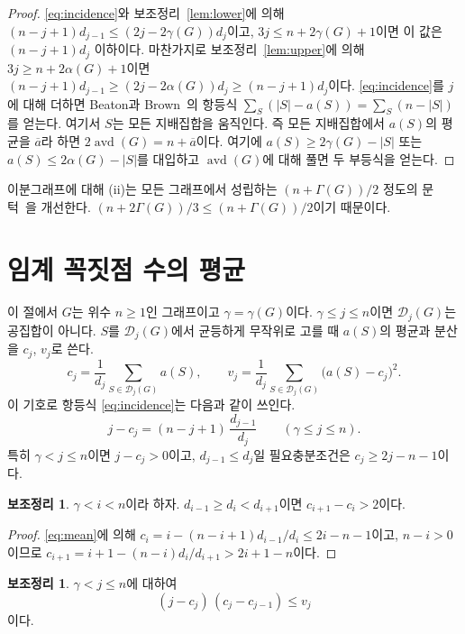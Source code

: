 \documentclass[11pt,a4paper]{article}
\theoremstyle{definition}
\newtheorem{lemma}[theorem]{보조정리}
\newcommand{\Dom}{\mathcal{D}}
\begin{document}
\begin{proof}
\eqref{eq:incidence}와 보조정리~\ref{lem:lower}에 의해
$(n-j+1)d_{j-1}\le(2j-2\gamma(G))d_j$이고, $3j\le n+2\gamma(G)+1$이면 이 값은
$(n-j+1)d_j$ 이하이다. 마찬가지로 보조정리~\ref{lem:upper}에 의해
$3j\ge n+2\alpha(G)+1$이면
$(n-j+1)d_{j-1}\ge(2j-2\alpha(G))d_j\ge(n-j+1)d_j$이다. \eqref{eq:incidence}를 $j$에
대해 더하면 Beaton과 Brown~\cite{BB21}의 항등식
$\sum_S(|S|-a(S))=\sum_S(n-|S|)$를 얻는다. 여기서 $S$는 모든 지배집합을 움직인다. 즉
모든 지배집합에서 $a(S)$의 평균을 $\overline a$라 하면
$2\operatorname{avd}(G)=n+\overline{a}$이다. 여기에 $a(S)\ge2\gamma(G)-|S|$ 또는
$a(S)\le2\alpha(G)-|S|$를 대입하고 $\operatorname{avd}(G)$에 대해 풀면 두 부등식을
얻는다.
\end{proof}

이분그래프에 대해 (ii)는 모든 그래프에서 성립하는 $(n+\Gamma(G))/2$ 정도의
문턱~\cite{BO}을 개선한다. $(n+2\Gamma(G))/3\le(n+\Gamma(G))/2$이기 때문이다.

\section{임계 꼭짓점 수의 평균}\label{sec:jump}

이 절에서 $G$는 위수 $n\ge1$인 그래프이고 $\gamma=\gamma(G)$이다. $\gamma\le j\le n$이면
$\Dom_j(G)$는 공집합이 아니다. $S$를 $\Dom_j(G)$에서 균등하게 무작위로 고를 때 $a(S)$의
평균과 분산을 $c_j$, $v_j$로 쓴다.
\[
  c_j=\frac1{d_j}\sum_{S\in\Dom_j(G)}a(S),\qquad
  v_j=\frac1{d_j}\sum_{S\in\Dom_j(G)}\bigl(a(S)-c_j\bigr)^2 .
\]
이 기호로 항등식 \eqref{eq:incidence}는 다음과 같이 쓰인다.
\begin{equation}\label{eq:mean}
  j-c_j=(n-j+1)\,\frac{d_{j-1}}{d_j}\qquad(\gamma\le j\le n).
\end{equation}
특히 $\gamma<j\le n$이면 $j-c_j>0$이고, $d_{j-1}\le d_j$일 필요충분조건은
$c_j\ge 2j-n-1$이다.

\begin{lemma}\label{lem:valley}
$\gamma<i<n$이라 하자. $d_{i-1}\ge d_i<d_{i+1}$이면 $c_{i+1}-c_i>2$이다.
\end{lemma}

\begin{proof}
\eqref{eq:mean}에 의해 $c_i=i-(n-i+1)d_{i-1}/d_i\le 2i-n-1$이고, $n-i>0$이므로
$c_{i+1}=i+1-(n-i)d_i/d_{i+1}>2i+1-n$이다.
\end{proof}

\begin{lemma}\label{lem:cov}
$\gamma<j\le n$에 대하여
\[
  (j-c_j)\,(c_j-c_{j-1})\le v_j
\]
이다.
\end{lemma}
\end{document}
